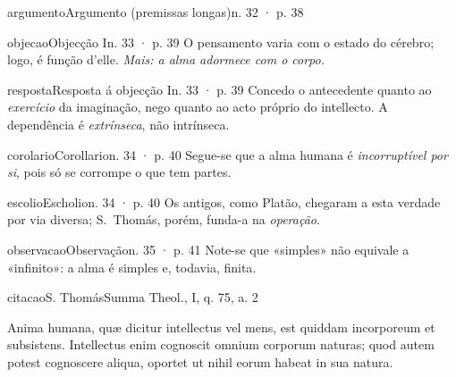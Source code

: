 \documentclass[aspectratio=169,11pt]{beamer}
\begin{document}
\begin{slide}{argumento}{Argumento (premissas longas)}{n. 32 · p. 38}
\begin{rotulados}
\end{rotulados}
\end{slide}

\begin{slide}{objecao}{Objecção I}{n. 33 · p. 39}
O pensamento varia com o estado do cérebro; logo, é função d'elle. \textit{Mais: a alma adormece com o corpo.}
\end{slide}

\begin{slide}{resposta}{Resposta á objecção I}{n. 33 · p. 39}
Concedo o antecedente quanto ao \textit{exercício} da imaginação, nego quanto ao acto próprio do intellecto. A dependência é \textit{extrínseca}, não intrínseca.
\end{slide}

\begin{slide}{corolario}{Corollario}{n. 34 · p. 40}
Segue-se que a alma humana é \textit{incorruptível por si}, pois só se corrompe o que tem partes.
\end{slide}

\begin{slide}{escolio}{Escholio}{n. 34 · p. 40}
Os antigos, como Platão, chegaram a esta verdade por via diversa; S.~Thomás, porém, funda-a na \textit{operação}.
\end{slide}

\begin{slide}{observacao}{Observação}{n. 35 · p. 41}
Note-se que «simples» não equivale a «infinito»: a alma é simples e, todavia, finita.
\end{slide}

\begin{slide}{citacao}{S. Thomás}{Summa Theol., I, q. 75, a. 2}
\begin{citacao}
Anima humana, quæ dicitur intellectus vel mens, est quiddam incorporeum et subsistens. Intellectus enim cognoscit omnium corporum naturas; quod autem potest cognoscere aliqua, oportet ut nihil eorum habeat in sua natura.
\end{citacao}
\end{slide}
\end{document}
